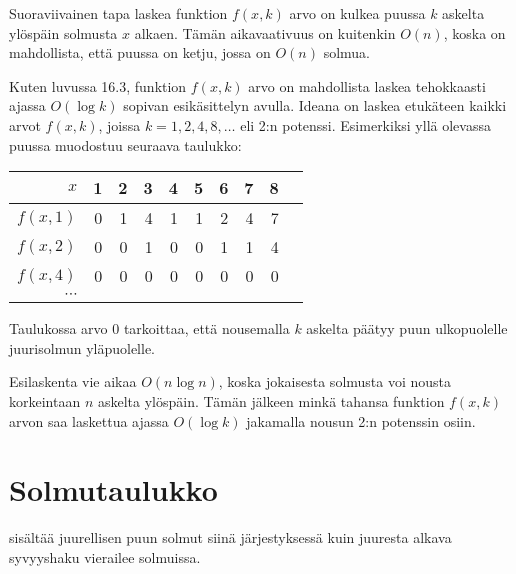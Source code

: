 Suoraviivainen tapa laskea funktion $f(x,k)$
arvo on kulkea puussa $k$ askelta ylöspäin
solmusta $x$ alkaen.
Tämän aikavaativuus on kuitenkin $O(n)$,
koska on mahdollista, että puussa on
ketju, jossa on $O(n)$ solmua.

Kuten luvussa 16.3, funktion $f(x,k)$
arvo on mahdollista laskea tehokkaasti ajassa
$O(\log k)$ sopivan esikäsittelyn avulla.
Ideana on laskea etukäteen kaikki arvot
$f(x,k)$, joissa $k=1,2,4,8,\ldots$ eli 2:n potenssi.
Esimerkiksi yllä olevassa puussa muodostuu seuraava taulukko:

\begin{center}
\begin{tabular}{r|rrrrrrrrr}
$x$ & 1 & 2 & 3 & 4 & 5 & 6 & 7 & 8 \\
\hline
$f(x,1)$ & 0 & 1 & 4 & 1 & 1 & 2 & 4 & 7 \\
$f(x,2)$ & 0 & 0 & 1 & 0 & 0 & 1 & 1 & 4 \\
$f(x,4)$ & 0 & 0 & 0 & 0 & 0 & 0 & 0 & 0 \\
$\cdots$ \\
\end{tabular}
\end{center}

Taulukossa arvo 0 tarkoittaa, että nousemalla $k$
askelta päätyy puun ulkopuolelle juurisolmun yläpuolelle.

Esilaskenta vie aikaa $O(n \log n)$, koska jokaisesta
solmusta voi nousta korkeintaan $n$ askelta ylöspäin.
Tämän jälkeen minkä tahansa funktion $f(x,k)$ arvon saa
laskettua ajassa $O(\log k)$ jakamalla nousun 2:n
potenssin osiin.

\section{Solmutaulukko}


 sisältää juurellisen puun solmut siinä
järjestyksessä kuin juuresta alkava syvyyshaku
vierailee solmuissa.

